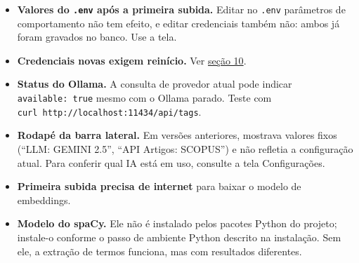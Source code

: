 \documentclass[
  brazilian,
  a4paper,12pt,oneside]{report}
\providecommand{\tightlist}{%
  \setlength{\itemsep}{0pt}\setlength{\parskip}{0pt}}
\begin{document}
\begin{itemize}
\tightlist
\item
  \textbf{Valores do \texttt{.}\allowbreak{}\texttt{env} após a primeira
  subida.} Editar no \texttt{.}\allowbreak{}\texttt{env} parâmetros de
  comportamento não tem efeito, e editar credenciais também não: ambos
  já foram gravados no banco. Use a tela.
\item
  \textbf{Credenciais novas exigem reinício.} Ver
  \hyperref[10-quando-reiniciar-o-backend]{seção 10}.
\item
  \textbf{Status do Ollama.} A consulta de provedor atual pode indicar
  \texttt{available:}\allowbreak{}\texttt{\ true} mesmo com o Ollama
  parado. Teste com
  \texttt{curl\ http:}\allowbreak{}\texttt{/}\allowbreak{}\texttt{/}\allowbreak{}\texttt{localhost:}\allowbreak{}\texttt{11434/}\allowbreak{}\texttt{api/}\allowbreak{}\texttt{tags}.
\item
  \textbf{Rodapé da barra lateral.} Em versões anteriores, mostrava
  valores fixos (``LLM: GEMINI 2.5'', ``API Artigos: SCOPUS'') e não
  refletia a configuração atual. Para conferir qual IA está em uso,
  consulte a tela Configurações.
\item
  \textbf{Primeira subida precisa de internet} para baixar o modelo de
  embeddings.
\item
  \textbf{Modelo do spaCy.} Ele não é instalado pelos pacotes Python do
  projeto; instale-o conforme o passo de ambiente Python descrito na
  instalação. Sem ele, a extração de termos funciona, mas com resultados
  diferentes.
\end{itemize}
\end{document}
